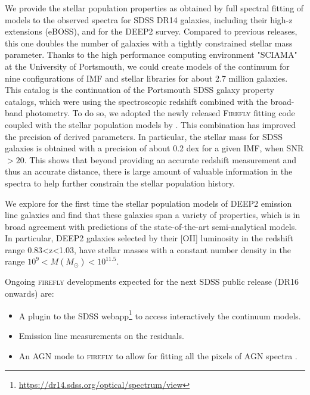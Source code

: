 \documentclass[onecolumn]{aa}
\begin{document}
We provide the stellar population properties as obtained by full spectral fitting of models to the observed spectra for SDSS DR14 galaxies, including their high-z extensions (eBOSS), and for the DEEP2 survey. 
Compared to previous releases, this one doubles the number of galaxies with a tightly constrained stellar mass parameter.
Thanks to the high performance computing environment "SCIAMA" at the University of Portsmouth, we could create models of the continuum for nine configurations of IMF and stellar libraries for about 2.7 million galaxies. 
This catalog is the continuation of the Portsmouth SDSS galaxy property catalogs, which were using the spectroscopic redshift combined with the broad-band photometry.
To do so, we adopted the newly released \textsc{Firefly} fitting code coupled with the stellar population  models by \citet{Maraston_2011}. This combination has improved the precision of derived parameters. In particular, the stellar mass for SDSS galaxies is obtained with a precision of about 0.2 dex for a given IMF, when SNR$>20$. 
This shows that beyond providing an accurate redshift measurement and thus an accurate distance, there is large amount of valuable information in the spectra to help further constrain the stellar population history. 

We explore for the first time the stellar population models of DEEP2 emission line galaxies and find that these galaxies span a variety of properties, which is in broad agreement with predictions of the state-of-the-art semi-analytical models. In particular, DEEP2 galaxies selected by their [OII] luminosity in the redshift range 0.83<z<1.03, have stellar masses with a constant number density in the range $10^9<M(M_{\odot})<10^{11.5}$.

Ongoing \textsc{firefly} developments expected for the next SDSS public release (DR16 onwards) are:
\begin{itemize}
\item A plugin to the SDSS webapp\footnote{\url{https://dr14.sdss.org/optical/spectrum/view}} to access interactively the continuum models.
\item Emission line measurements on the residuals.
\item An AGN mode to \textsc{firefly} to allow for fitting all the pixels of AGN spectra \citep[e.g.][]{2017MNRAS.472.4051C}.
\end{itemize}
\end{document}
